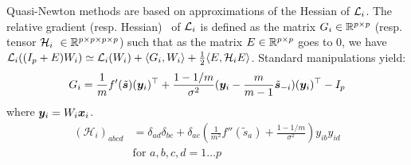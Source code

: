 Quasi-Newton methods are based on approximations of the Hessian of $\mathcal{L}_i$.
%
The relative gradient (resp. Hessian)~\cite{amari1996new, cardoso1996equivariant} of $\mathcal{L}_i$ is defined as the matrix $G_i\in \mathbb{R}^{p \times p}$ (resp. tensor $\mathcal{H}_i \in \bbR^{p\times p\times p\times p}$) such that as the matrix $E\in\mathbb{R}^{p\times p}$ goes to $0$, we have $\mathcal{L}_i((I_p + E)W_i) \simeq \mathcal{L}_i(W_i) + \langle G_i, W_i\rangle + \frac12\langle E, \mathcal{H}_iE\rangle$. Standard manipulations yield:
\begin{equation}
    \label{eq:gradient}
    G_i = \frac1mf'(\tilde{\boldsymbol{s}})(\boldsymbol{y}_i)^{\top} + \frac{1 - 1 /m}{\sigma^2}(\boldsymbol{y}_i - \frac{m}{m-1}\tilde{\boldsymbol{s}}_{-i})(\boldsymbol{y}_i)^{\top} - I_p 
\end{equation}
where $\boldsymbol{y}_i= W_i\boldsymbol{x}_i$.
\begin{align}
    \label{eq:hessian}
    (\mathcal{H}_i)_{abcd} &= \delta_{ad}\delta_{bc} + \delta_{ac}\left(\frac{1}{m^2}f''(\tilde{s}_a) + \frac{1 - 1/m}{\sigma^2}\right)y_{ib}y_{id} \\ &\text{for }a, b, c, d =1\dots p \nonumber
\end{align}

